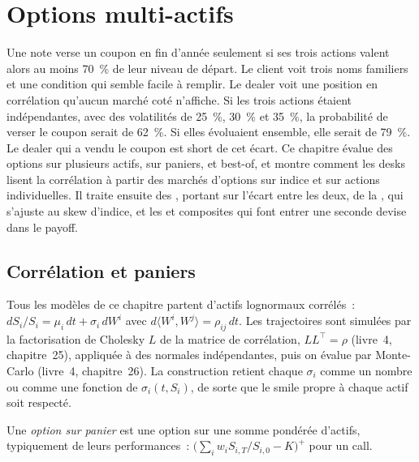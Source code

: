 \chapter{Options multi-actifs}\label{ch:dv:multi-asset-options}

Une note verse un coupon en fin d'année seulement si ses trois actions valent alors au moins 70~\% de leur
niveau de départ. Le client voit trois noms familiers et une condition qui semble facile à remplir. Le dealer voit une
position en corrélation qu'aucun marché coté n'affiche. Si les trois actions étaient indépendantes, avec des volatilités de
25~\%, 30~\% et 35~\%, la probabilité de verser le coupon serait de 62~\%. Si elles évoluaient ensemble, elle serait de 79~\%. Le
dealer qui a vendu le coupon est short de cet écart. Ce chapitre évalue des options sur plusieurs actifs, sur paniers,
 et best-of, et montre comment les desks lisent la corrélation à partir des marchés d'options sur indice et sur actions individuelles. Il
traite ensuite des , portant sur l'écart entre les deux, de la , qui s'ajuste au skew d'indice, et les
 et composites qui font entrer une seconde devise dans le payoff.

\section{Corrélation et paniers}

Tous les modèles de ce chapitre partent d'actifs lognormaux corrélés~:
$dS_i/S_i=\mu_i\,dt+\sigma_i\,dW^i$ avec $d\langle W^i,W^j\rangle=\rho_{ij}\,dt$. Les trajectoires sont simulées par la
factorisation de Cholesky $L$ de la matrice de corrélation, $LL^\top=\rho$ (livre~4, chapitre~25), appliquée à des
normales indépendantes, puis on évalue par Monte-Carlo (livre~4, chapitre~26). La construction retient chaque $\sigma_i$ comme un nombre ou comme une
fonction de  $\sigma_i(t,S_i)$, de sorte que le smile propre à chaque actif soit respecté.

\begin{definition}\label{def:dv:multi-asset-options:basket}
Une \emph{option sur panier} est une option sur une somme pondérée d'actifs, typiquement de leurs
performances~: $\bigl(\sum_iw_iS_{i,T}/S_{i,0}-K\bigr)^+$ pour un call.
\end{definition}

